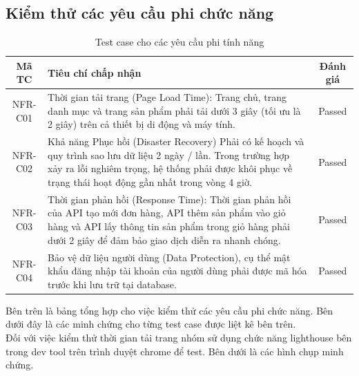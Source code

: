 \subsection{Kiểm thử các yêu cầu phi chức năng}

\begin{table}[H]
  \centering
  \renewcommand{\arraystretch}{1.3}
  \begin{tabular}{|c|p{8.3cm}|c|}
    \hline
    \textbf{Mã TC} & \textbf{Tiêu chí chấp nhận}                                                                                                                                                                                                  & \textbf{Đánh giá} \\
    \hline
    NFR-C01        & Thời gian tải trang (Page Load Time): Trang chủ, trang danh mục và trang sản phẩm phải tải dưới 3 giây (tối ưu là 2 giây) trên cả thiết bị di động và máy tính.                                                              & Passed            \\
    \hline
    NFR-C02        & Khả năng Phục hồi (Disaster Recovery)  Phải có kế hoạch và quy trình sao lưu dữ liệu 2 ngày / lần. Trong trường hợp xảy ra lỗi nghiêm trọng, hệ thống phải được khôi phục về trạng thái hoạt động gần nhất trong vòng 4 giờ. & Passed            \\
    \hline
    NFR-C03        & Thời gian phản hồi (Response Time): Thời gian phản hồi của API tạo mới đơn hàng, API thêm sản phẩm vào giỏ hàng và API lấy thông tin sản phẩm trong giỏ hàng phải dưới 2 giây để đảm bảo giao dịch diễn ra nhanh chóng.      & Passed            \\
    \hline
    NFR-C04        & Bảo vệ dữ liệu người dùng (Data Protection), cụ thể mật khẩu đăng nhập tài khoản của người dùng phải được mã hóa trước khi lưu trữ tại database.                                                                             & Passed            \\
    \hline
  \end{tabular}
  \caption{Test case cho các yêu cầu phi tính năng}
\end{table}

Bên trên là bảng tổng hợp cho việc kiểm thử các yêu cầu phi chức năng. Bên dưới đây là các minh chứng cho từng test case được liệt kê bên trên. \\

Đối với việc kiểm thử thời gian tải trang nhóm sử dụng chức năng lighthouse bên trong dev tool trên trình duyệt chrome để test. Bên dưới là các hình chụp minh chứng.

